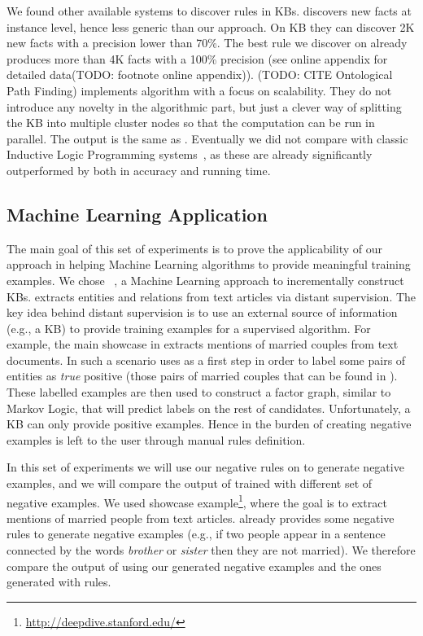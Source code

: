 We found other available systems to discover rules in KBs. \cite{abedjan2014amending} discovers new facts at instance level, hence less generic than our approach. On \amie {} KB they can discover 2K new facts with a precision lower than 70\%. The best rule we discover on  already produces more than 4K facts with a 100\% precision (see online appendix for detailed data(TODO: footnote online appendix)). (TODO: CITE Ontological Path Finding) implements \amie algorithm with a focus on scalability. They do not introduce any novelty in the algorithmic part, but just a clever way of splitting the KB into multiple cluster nodes so that the computation can be run in parallel. The output is the same as \amie. Eventually we did not compare with classic Inductive Logic Programming systems~\cite{dehaspe1999discovery,muggleton1995inverse}, as these are already significantly outperformed by \amie both in accuracy and running time.

\subsection{Machine Learning Application} \label{sec:krd_deep_dive}
The main goal of this set of experiments is to prove the applicability of our approach in helping Machine Learning algorithms to provide meaningful training examples.
We chose \deepdive~\cite{shin2015incremental}, a Machine Learning approach to incrementally construct KBs. \deepdive extracts entities and relations from text articles via distant supervision. The key idea behind distant supervision is to use an external source of information (e.g., a KB) to provide training examples for a supervised algorithm. For example, the main showcase in \deepdive extracts mentions of married couples from text documents. In such a scenario \deepdive uses as a first step \dbpedia in order to label some pairs of entities as \emph{true} positive (those pairs of married couples that can be found in \dbpedia). These labelled examples are then used to construct a factor graph, similar to Markov Logic, that will predict labels on the rest of candidates. Unfortunately, a KB can only provide positive examples. Hence in \deepdive the burden of creating negative examples is left to the user through manual rules definition.

In this set of experiments we will use our negative rules on \dbpedia to generate negative examples, and we will compare the output of \deepdive trained with different set of negative examples. We used \deepdive showcase example\footnote{\url{http://deepdive.stanford.edu/}}, where the goal is to extract mentions of married people from text articles. \deepdive already provides some negative rules to generate negative examples (e.g., if two people appear in a sentence connected by the words \textit{brother} or \textit{sister} then they are not married). We therefore compare the output of \deepdive using our generated negative examples and the ones generated with \deepdive rules. 

